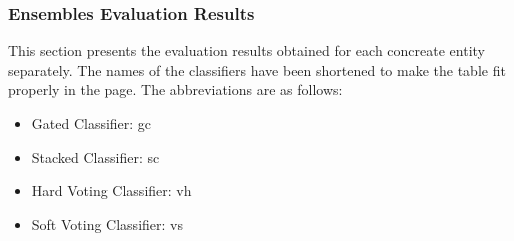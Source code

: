 \documentclass[epsfig,a4paper,11pt,titlepage,twoside,openany]{book}
\begin{document}
\subsubsection{Ensembles Evaluation Results}
\label{sec:apx-ensemble-eval-results}

This section presents the evaluation results obtained for each concreate entity separately. The names of the classifiers have been shortened to make the table fit properly in the page. The abbreviations are as follows:

\begin{itemize}
    \item Gated Classifier: gc
    \item Stacked Classifier: sc
    \item Hard Voting Classifier: vh
    \item Soft Voting Classifier: vs
\end{itemize}
\end{document}
